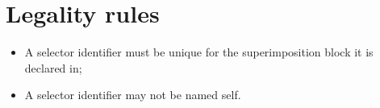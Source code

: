 \section*{Legality rules}
\begin{itemize}[noitemsep]
\item A selector identifier must be unique for the superimposition block it is declared in;
\item A selector identifier may not be named self.
\end{itemize}

\comments{ }
\dotnetcomment{}
